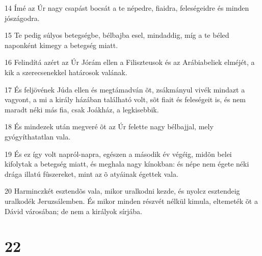 \par 14 Ímé az Úr nagy csapást bocsát a te népedre, fiaidra, feleségeidre és minden jószágodra.
\par 15 Te pedig súlyos betegségbe, bélbajba esel, mindaddig, míg a te béled naponként kimegy a betegség miatt.
\par 16 Felindítá azért az Úr Jórám ellen a Filiszteusok és az Arábiabeliek elméjét, a kik a szerecsenekkel határosok valának.
\par 17 És feljövének Júda ellen és megtámadván õt, zsákmányul vivék mindazt a vagyont, a mi a király házában található volt, sõt fiait és feleségeit is, és nem maradt néki más fia, csak Joákház, a legkisebbik.
\par 18 És mindezek után megveré õt az Úr felette nagy bélbajjal, mely gyógyíthatatlan vala.
\par 19 És ez így volt napról-napra, egészen a második év végéig, midõn belei kifolytak a betegség miatt, és meghala nagy kínokban: és népe nem égete néki drága illatú fûszereket, mint az õ atyáinak égettek vala.
\par 20 Harminczkét esztendõs vala, mikor uralkodni kezde, és nyolcz esztendeig uralkodék Jeruzsálemben. És mikor minden részvét nélkül kimula, eltemeték õt a Dávid városában; de nem a királyok sírjába.

\chapter{22}


